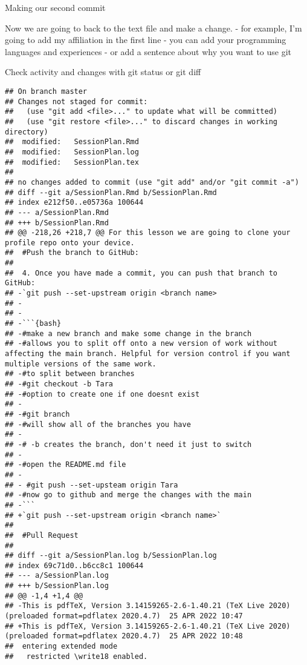 \documentclass[ignorenonframetext,]{beamer}
\begin{document}
\begin{frame}{Making our second commit}

Now we are going to back to the text file and make a change. - for
example, I'm going to add my affiliation in the first line - you can add
your programming languages and experiences - or add a sentence about why
you want to use git

\end{frame}

\begin{frame}[fragile]{Check activity and changes with git status or git
diff}

\begin{verbatim}
## On branch master
## Changes not staged for commit:
##   (use "git add <file>..." to update what will be committed)
##   (use "git restore <file>..." to discard changes in working directory)
##  modified:   SessionPlan.Rmd
##  modified:   SessionPlan.log
##  modified:   SessionPlan.tex
## 
## no changes added to commit (use "git add" and/or "git commit -a")
## diff --git a/SessionPlan.Rmd b/SessionPlan.Rmd
## index e212f50..e05736a 100644
## --- a/SessionPlan.Rmd
## +++ b/SessionPlan.Rmd
## @@ -218,26 +218,7 @@ For this lesson we are going to clone your profile repo onto your device.
##  #Push the branch to GitHub:
##  
##  4. Once you have made a commit, you can push that branch to GitHub:
## -`git push --set-upstream origin <branch name>
## -
## -
## -```{bash}
## -#make a new branch and make some change in the branch
## -#allows you to split off onto a new version of work without affecting the main branch. Helpful for version control if you want multiple versions of the same work. 
## -#to split between branches
## -#git checkout -b Tara
## -#option to create one if one doesnt exist
## -
## -#git branch 
## -#will show all of the branches you have
## -
## -# -b creates the branch, don't need it just to switch
## -
## -#open the README.md file
## -
## - #git push --set-upsteam origin Tara
## -#now go to github and merge the changes with the main
## -```
## +`git push --set-upstream origin <branch name>`
##  
##  #Pull Request
##  
## diff --git a/SessionPlan.log b/SessionPlan.log
## index 69c71d0..b6cc8c1 100644
## --- a/SessionPlan.log
## +++ b/SessionPlan.log
## @@ -1,4 +1,4 @@
## -This is pdfTeX, Version 3.14159265-2.6-1.40.21 (TeX Live 2020) (preloaded format=pdflatex 2020.4.7)  25 APR 2022 10:47
## +This is pdfTeX, Version 3.14159265-2.6-1.40.21 (TeX Live 2020) (preloaded format=pdflatex 2020.4.7)  25 APR 2022 10:48
##  entering extended mode
##   restricted \write18 enabled.

\end{verbatim}
\end{frame}
\end{document}
